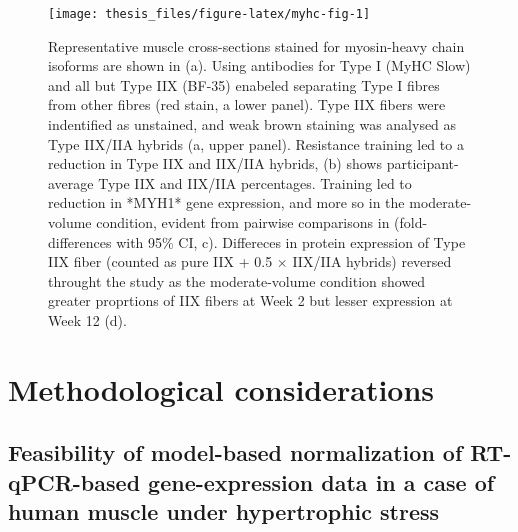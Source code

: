 \documentclass[twoside,10pt]{gihclass} %
\begin{document}
\pagebreak
\begin{figure}

{\centering \texttt{[image: thesis\_files/figure-latex/myhc-fig-1]} 

}

\caption[Fiber-type composition in Study I]{Representative muscle cross-sections stained for myosin-heavy chain isoforms are shown in (a). Using antibodies for Type I (MyHC Slow) and all but Type IIX (BF-35) enabeled separating Type I fibres from other fibres (red stain, a lower panel). Type IIX fibers were indentified as unstained, and weak brown staining was analysed as Type IIX/IIA hybrids (a, upper panel). Resistance training led to a reduction in Type IIX and IIX/IIA hybrids, (b) shows participant-average Type IIX and IIX/IIA percentages. Training led to reduction in *MYH1* gene expression, and more so in the moderate-volume condition, evident from pairwise comparisons in (fold-differences with 95\% CI, c). Differeces in protein expression of Type IIX fiber (counted as pure IIX + 0.5 $\times$ IIX/IIA hybrids) reversed throught the study as the moderate-volume condition showed greater proprtions of IIX fibers at Week 2 but lesser expression at Week 12 (d).}\label{fig:myhc-fig}
\end{figure}
\pagebreak

\hypertarget{methodological-considerations}{%
\chapter{Methodological considerations}\label{methodological-considerations}}

\hypertarget{feasibility-of-model-based-normalization-of-rt-qpcr-based-gene-expression-data-in-a-case-of-human-muscle-under-hypertrophic-stress}{%
\section{Feasibility of model-based normalization of RT-qPCR-based gene-expression data in a case of human muscle under hypertrophic stress}\label{feasibility-of-model-based-normalization-of-rt-qpcr-based-gene-expression-data-in-a-case-of-human-muscle-under-hypertrophic-stress}}
\end{document}
